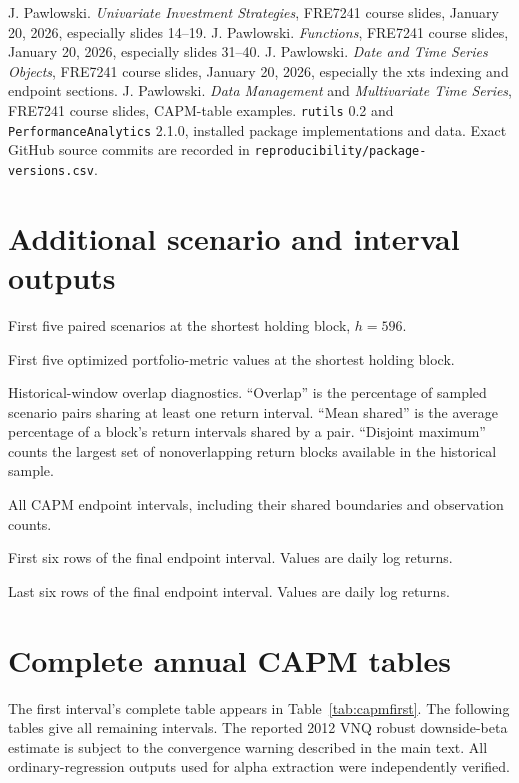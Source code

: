 \documentclass[11pt,letterpaper]{article}
\newcommand{\wideinput}[3]{%
  \begin{table}[H]\centering
  \caption{#2}\label{#3}
  \resizebox{\linewidth}{!}{}
  \end{table}}
\newcommand{\smallinput}[3]{%
  \begin{table}[H]\centering
  \caption{#2}\label{#3}
  {\small}
  \end{table}}
\begin{document}
\begin{thebibliography}{9}
 J. Pawlowski. \emph{Univariate Investment Strategies},
FRE7241 course slides, January 20, 2026, especially slides 14--19.
 J. Pawlowski. \emph{Functions}, FRE7241 course slides,
January 20, 2026, especially slides 31--40.
 J. Pawlowski. \emph{Date and Time Series Objects}, FRE7241
course slides, January 20, 2026, especially the xts indexing and endpoint
sections.
 J. Pawlowski. \emph{Data Management} and
\emph{Multivariate Time Series}, FRE7241 course slides, CAPM-table examples.
 \texttt{rutils} 0.2 and \texttt{PerformanceAnalytics}
2.1.0, installed package implementations and data. Exact GitHub source commits
are recorded in \texttt{reproducibility/package-versions.csv}.
\end{thebibliography}

\clearpage
\appendix
\section{Additional scenario and interval outputs}
\label{app:additional}
\wideinput{short_returns_first5.tex}{First five paired scenarios at the
shortest holding block, $h=596$.}{tab:shortreturns}
\smallinput{short_wealth_first5.tex}{First five optimized portfolio-metric
values at the shortest holding block.}{tab:shortwealth}
\wideinput{bootstrap_overlap.tex}{Historical-window overlap diagnostics.
``Overlap'' is the percentage of sampled scenario pairs sharing at least one
return interval. ``Mean shared'' is the average percentage of a block's return
intervals shared by a pair. ``Disjoint maximum'' counts the largest set of
nonoverlapping return blocks available in the historical sample.}{tab:overlap}
\wideinput{annual_windows.tex}{All CAPM endpoint intervals, including
their shared boundaries and observation counts.}{tab:windows}
\wideinput{last_window_head.tex}{First six rows of the final endpoint
interval. Values are daily log returns.}{tab:lasthead}
\wideinput{last_window_tail.tex}{Last six rows of the final endpoint
interval. Values are daily log returns.}{tab:lasttail}

\clearpage
\section{Complete annual CAPM tables}
\label{app:capm}
The first interval's complete table appears in Table~\ref{tab:capmfirst}.
The following tables give all remaining intervals. The reported 2012 VNQ
robust downside-beta estimate is subject to the convergence warning described
in the main text. All ordinary-regression outputs used for alpha extraction
were independently verified.

\end{document}

